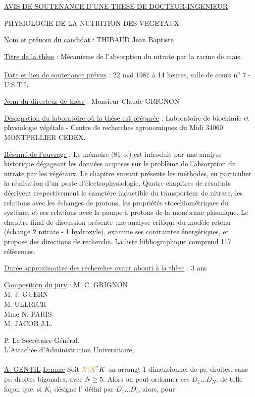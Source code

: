 \uline{AVIS DE SOUTENANCE D'UNE THESE DE DOCTEUR-INGENIEUR}

PHYSIOLOGIE DE LA NUTRITION DES VEGETAUX

\uline{Nom et prénom du candidat} : THIBAUD Jean Baptiste

\uline{Titre de la thèse} : Mécanisme de l'absorption du nitrate par la racine de maïs.

\uline{Date et lieu de soutenance prévus} : 22 mai 1981 à 14 heures, salle de cours n\textsuperscript{o} 7 - U.S.T.L.

\uline{Nom du directeur de thèse} : Monsieur Claude GRIGNON

\uline{Désignation du laboratoire où la thèse est préparée} : Laboratoire de biochimie et physiologie végétale - Centre de recherches agronomiques du Midi 34060 MONTPELLIER CEDEX.

\uline{Résumé de l'ouvrage} : Le mémoire (81 p.) est introduit par une analyse historique dégageant les données acquises sur le problème de l'absorption du nitrate par les végétaux. Le chapitre suivant présente les méthodes, en particulier la réalisation d'un poste d'électrophysiologie. Quatre chapitres de résultats décrivent respectivement le caractère inductible du transporteur de nitrate, les relations avec les échanges de protons, les propriétés stoechiométriques du système, et ses relations avec la pompe à protons de la membrane plasmique. Le chapitre final de discussion présente une analyse critique du modèle retenu (échange 2 nitrate - 1 hydroxyle), examine ses contraintes énergétiques, et propose des directions de recherche. La liste bibliographique comprend 117 références.

\uline{Durée approximative des recherches ayant abouti à la thèse} : 3 ans

\uline{Composition du jury} : M. C. GRIGNON\\
M. J. GUERN\\
M.  ULLRICH\\
Mme N. PARIS\\
M. JACOB J.L.

P. Le Secrétaire Général,\\
L'Attachée d'Administration Universitaire,\\
\\
\uline{A. GENTIL}
\uline{Lemme} Soit $\deleted{\unsure{\mathcal X|X}}K$ un arrangt 1-dimensionnel de  ps. droites, sans ps. droites bigonales, avec $N\geq5$. Alors on peut ordonner ces $D_1\ldots D_N$, de telle façon que, si $K_i$ désigne l' défini par $D_1\ldots D_i$, alors, pour

